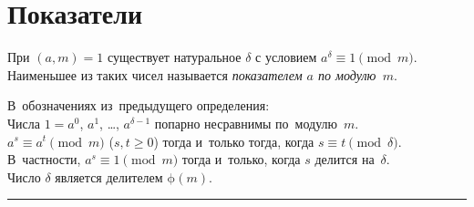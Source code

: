 
\section*{Показатели}


При $(a, m) = 1$ существует натуральное $\delta$ с условием
\(
    a^{\delta} \equiv 1 \pmod{m}
\).
Наименьшее из таких чисел называется \emph{показателем $a$ по модулю~$m$}.

\begin{problems}

\item
В~обозначениях из~предыдущего определения:
\\
\subproblem
Числа $1 = a^0$, $a^1$, \ldots, $a^{\delta-1}$ попарно несравнимы
по~модулю~$m$.
\\
\subproblem
$a^s \equiv a^t \pmod{m}$ ($s, t \geq 0$)
тогда и~только тогда, когда
$s \equiv t \pmod{\delta}$.
В~частности, $a^s \equiv 1 \pmod{m}$
тогда и~только, когда
$s$ делится на~$\delta$.
\\
\subproblem
Число $\delta$ является делителем $\mathrm{\phi}(m)$.

\end{problems}

\medskip
\hrule

